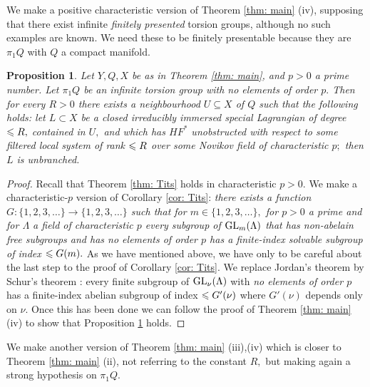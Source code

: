 \documentclass{article}
\theoremstyle{plain}%
\newtheorem{prop}[thm]{Proposition}
\theoremstyle{definition}
\numberwithin{equation}{section}
\numberwithin{figure}{section}
\def\l{\label}
\def\GL{\mathop{\rm GL}}
\def\le{\leqslant\nobreak}
\def\La{\Lambda}
\def\sb{\subseteq}
\begin{document}
We make a positive characteristic version of Theorem \ref{thm: main} (iv), supposing that there exist infinite {\it finitely presented} torsion groups, although no such examples are known. We need these to be finitely presentable because they are $\pi_1Q$ with $Q$ a compact manifold.

\begin{prop}\l{prop: p version}
Let $Y,Q,X$ be as in Theorem \ref{thm: main}, and $p>0$ a prime number. Let $\pi_1Q$ be an infinite torsion group with no elements of order $p.$ Then for every $R>0$ there exists a neighbourhood $U\sb X$ of $Q$ such that the following holds: let $L\subset X$ be a closed irreducibly immersed special Lagrangian of degree $\le R,$ contained in $U,$ and which has $HF^*$ unobstructed with respect to some filtered local system of rank $\le R$ over some Novikov field of characteristic $p;$ then $L$ is unbranched.
\end{prop}
\begin{proof}
Recall that Theorem \ref{thm: Tits} holds in characteristic $p>0.$ We make a characteristic-$p$ version of Corollary \ref{cor: Tits}: {\it there exists a function $G:\{1,2,3,\dots\}\to \{1,2,3,\dots\}$ such that for $m\in\{1,2,3,\dots\},$ for $p>0$ a prime and for $\La$ a field of characteristic $p$ every subgroup of $\GL_m(\La)$ that has non-abelain free subgroups and has no elements of order $p$ has a finite-index solvable subgroup of index $\le G(m).$} As we have mentioned above, we have only to be careful about the last step to the proof of Corollary \ref{cor: Tits}. We replace Jordan's theorem \cite[Theorem 9.2]{Wehr} by Schur's theorem \cite[Corollary 9.4]{Wehr}: every finite subgroup of $\GL_\nu(\La)$ with {\it no elements of order $p$} has a finite-index abelian subgroup of index $\le G'(\nu)$ where $G'(\nu)$ depends only on $\nu.$ Once this has been done we can follow the proof of Theorem \ref{thm: main} (iv) to show that Proposition \ref{prop: p version} holds.
\end{proof}

We make another version of Theorem \ref{thm: main} (iii),(iv) which is closer to Theorem \ref{thm: main} (ii), not referring to the constant $R,$ but making again a strong hypothesis on $\pi_1Q.$ 
\end{document}
